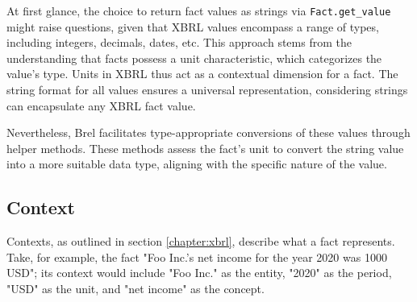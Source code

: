 At first glance, the choice to return fact values as strings via \texttt{Fact.get\_value} might raise questions, 
given that XBRL values encompass a range of types, including integers, decimals, dates, etc.
This approach stems from the understanding that facts possess a unit characteristic, 
which categorizes the value's type.
Units in XBRL thus act as a contextual dimension for a fact.
The string format for all values ensures a universal representation, considering strings can encapsulate any XBRL fact value.

Nevertheless, Brel facilitates type-appropriate conversions of these values through helper methods.
These methods assess the fact's unit to convert the string value into a more suitable data type, aligning with the specific nature of the value.

\subsection{Context}

Contexts, as outlined in section \ref{chapter:xbrl}, describe what a fact represents.
Take, for example, the fact "Foo Inc.'s net income for the year 2020 was 1000 USD"; \label{point:foo_net_income}
its context would include "Foo Inc." as the entity, "2020" as the period, "USD" as the unit, and "net income" as the concept.

